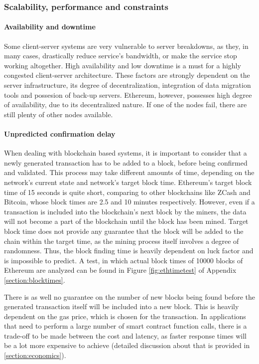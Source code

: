 \subsubsection{Scalability, performance and constraints} \label{section:scalability}

\paragraph{Availability and downtime}
Some client-server systems are very vulnerable to server breakdowns, as they, in many cases, drastically reduce service's bandwidth, or make the service stop working altogether. High availability and low downtime is a must for a highly congested client-server architecture. These factors are strongly dependent on the server infrastructure, its degree of decentralization, integration of data migration tools and possesion of back-up servers. Ethereum, however, possesses high degree of availability, due to its decentralized nature. If one of the nodes fail, there are still plenty of other nodes available.

\paragraph{Unpredicted confirmation delay}
When dealing with blockchain based systems, it is important to consider that a newly generated transaction has to be added to a block, before being confirmed and validated. This process may take different amounts of time, depending on the network's current state and network's target block time. Ethereum's target block time of 15 seconds is quite short, comparing to other blockchains like ZCash and Bitcoin, whose block times are 2.5 and 10 minutes respectively. However, even if a transaction is included into the blockchain's next block by the miners, the data will not become a part of the blockchain until the block has been mined. Target block time does not provide any guarantee that the block will be added to the chain within the target time, as the mining process itself involves a degree of randomness. Thus, the block finding time is heavily dependent on luck factor and is impossible to predict. A test, in which actual block times of 10000 blocks of Ethereum are analyzed can be found in Figure \ref{fig:ethtimetest} of Appendix \ref{section:blocktimes}.

There is as well no guarantee on the number of new blocks being found before the generated transaction itself will be included into a new block. This is heavily dependent on the gas price, which is chosen for the transaction. In applications that need to perform a large number of smart contract function calls, there is a trade-off to be made between the cost and latency, as faster response times will be a lot more expensive to achieve (detailed discussion about that is provided in \ref{section:economics}).


